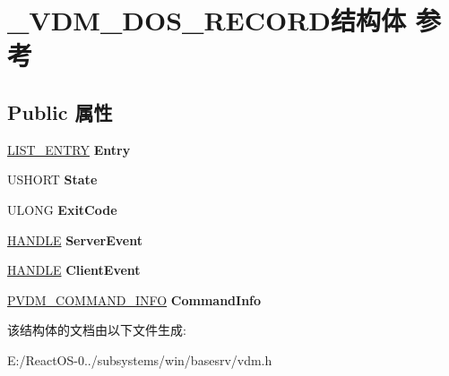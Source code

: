 \hypertarget{struct___v_d_m___d_o_s___r_e_c_o_r_d}{}\section{\+\_\+\+V\+D\+M\+\_\+\+D\+O\+S\+\_\+\+R\+E\+C\+O\+R\+D结构体 参考}
\label{struct___v_d_m___d_o_s___r_e_c_o_r_d}
\subsection*{Public 属性}
\begin{DoxyCompactItemize}
\item 
\mbox{\label{struct___v_d_m___d_o_s___r_e_c_o_r_d_aaa564316c9f737495a0691e34e171cbe}} 
\hyperlink{struct___l_i_s_t___e_n_t_r_y}{L\+I\+S\+T\+\_\+\+E\+N\+T\+RY} {\bfseries Entry}
\item 
\mbox{\label{struct___v_d_m___d_o_s___r_e_c_o_r_d_adb4d17c11f37aa76d8faff801267c949}} 
U\+S\+H\+O\+RT {\bfseries State}
\item 
\mbox{\label{struct___v_d_m___d_o_s___r_e_c_o_r_d_a5e3194ac75847880b43c05cedb4fff1a}} 
U\+L\+O\+NG {\bfseries Exit\+Code}
\item 
\mbox{\label{struct___v_d_m___d_o_s___r_e_c_o_r_d_a3a0af54ddb139007cdefe486bc3a0bad}} 
\hyperlink{interfacevoid}{H\+A\+N\+D\+LE} {\bfseries Server\+Event}
\item 
\mbox{\label{struct___v_d_m___d_o_s___r_e_c_o_r_d_a39c2175012a5bf8bf7202c549c972e63}} 
\hyperlink{interfacevoid}{H\+A\+N\+D\+LE} {\bfseries Client\+Event}
\item 
\mbox{\label{struct___v_d_m___d_o_s___r_e_c_o_r_d_af967cfaea8217dfdb11d3ccc246ef54c}} 
\hyperlink{struct_v_d_m___c_o_m_m_a_n_d___i_n_f_o}{P\+V\+D\+M\+\_\+\+C\+O\+M\+M\+A\+N\+D\+\_\+\+I\+N\+FO} {\bfseries Command\+Info}
\end{DoxyCompactItemize}


该结构体的文档由以下文件生成\+:\begin{DoxyCompactItemize}
\item 
E\+:/\+React\+O\+S-\/0../subsystems/win/basesrv/vdm.\+h\end{DoxyCompactItemize}
